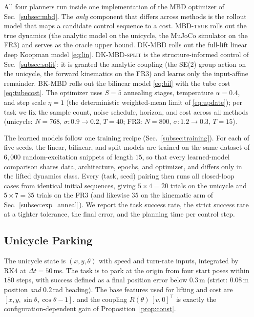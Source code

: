 \documentclass[lettersize,journal]{IEEEtran}
\theoremstyle{remark}
\newcommand{\mbdtrue}{\textsc{MBD-true}}
\newcommand{\dkmbd}{\textsc{DK-MBD}}
\newcommand{\dksplit}{\textsc{DK-MBD-split}}
\newcommand{\bkmbd}{\textsc{BK-MBD}}
\begin{document}
All four planners run inside one implementation of the MBD optimizer of
Sec.~\ref{subsec:mbd}. The \emph{only} component that differs across
methods is the rollout model that maps a candidate control sequence to
a cost. \mbdtrue{} rolls out the true dynamics (the analytic model on the
unicycle, the MuJoCo simulator on the FR3) and serves as the oracle
upper bound. \dkmbd{} rolls out the full-lift linear deep Koopman model
\eqref{eq:lin}. \dksplit{} is the structure-informed control of
Sec.~\ref{subsec:split}: it is granted the analytic coupling (the SE(2)
group action on the unicycle, the forward kinematics on the FR3) and
learns only the input-affine remainder. \bkmbd{} rolls out the bilinear
model \eqref{eq:bil} with the tube cost \eqref{eq:tubecost}. The optimizer
uses $S = 5$ annealing stages, temperature $\alpha = 0.4$, and step scale
$\eta = 1$ (the deterministic weighted-mean limit of \eqref{eq:update});
per task we fix the sample count, noise schedule, horizon, and cost across
all methods (unicycle: $N = 768$, $\sigma\!: 0.9 \to 0.2$, $T = 40$;
FR3: $N = 800$, $\sigma\!: 1.2 \to 0.3$, $T = 15$).

The learned models follow one training recipe
(Sec.~\ref{subsec:training}). For each of five seeds, the linear,
bilinear, and split models are trained on the same dataset of $6{,}000$
random-excitation snippets of length $15$, so that every learned-model
comparison shares data, architecture, epochs, and optimizer, and
differs only in the lifted dynamics class. Every
(task, seed) pairing then runs all closed-loop cases from identical initial
sequences, giving $5 \times 4 = 20$ trials on the unicycle and
$5 \times 7 = 35$ trials on the FR3 (and likewise $35$ on the kinematic
arm of Sec.~\ref{subsec:exp_anneal}). We report the task success rate, the
strict success rate at a tighter tolerance, the final error, and the
planning time per control step.

\subsection{Unicycle Parking}\label{subsec:exp_unicycle}

The unicycle state is $(x, y, \theta)$ with speed and turn-rate inputs,
integrated by RK4 at $\Delta t = 50$\,ms. The task is to park at the
origin from four start poses within $180$ steps, with success defined
as a final position error below $0.3$\,m (strict: $0.08$\,m position
\emph{and} $0.2$\,rad heading). The base features used for lifting and cost are
$[x, y, \sin\theta, \cos\theta - 1]$, and the coupling
$R(\theta)\,[v, 0]^\top$ is exactly the configuration-dependent gain of
Proposition~\ref{prop:const}.
\end{document}
